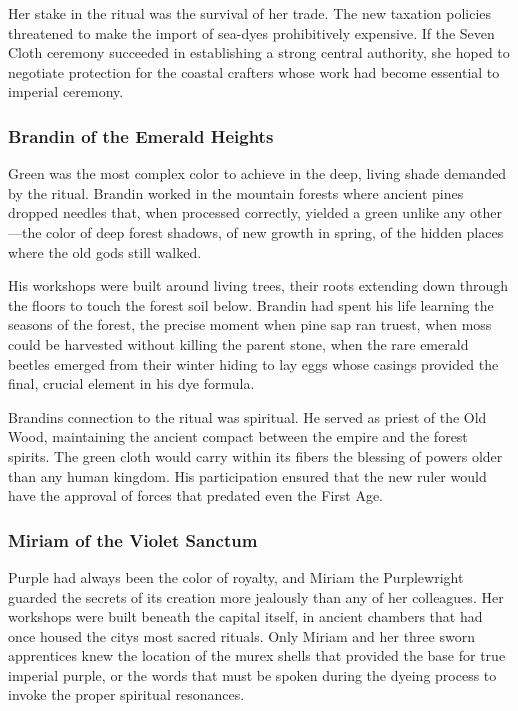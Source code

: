 Her stake in the ritual was the survival of her trade. The new taxation
policies threatened to make the import of sea-dyes prohibitively
expensive. If the Seven Cloth ceremony succeeded in establishing a
strong central authority, she hoped to negotiate protection for the
coastal crafters whose work had become essential to imperial ceremony.

\subsubsection{Brandin of the Emerald
Heights}\label{brandin-of-the-emerald-heights}

Green was the most complex color to achieve in the deep, living shade
demanded by the ritual. Brandin worked in the mountain forests where
ancient pines dropped needles that, when processed correctly, yielded a
green unlike any other---the color of deep forest shadows, of new growth
in spring, of the hidden places where the old gods still walked.

His workshops were built around living trees, their roots extending down
through the floors to touch the forest soil below. Brandin had spent his
life learning the seasons of the forest, the precise moment when pine
sap ran truest, when moss could be harvested without killing the parent
stone, when the rare emerald beetles emerged from their winter hiding to
lay eggs whose casings provided the final, crucial element in his dye
formula.

Brandin\textquotesingle s connection to the ritual was spiritual. He
served as priest of the Old Wood, maintaining the ancient compact
between the empire and the forest spirits. The green cloth would carry
within its fibers the blessing of powers older than any human kingdom.
His participation ensured that the new ruler would have the approval of
forces that predated even the First Age.

\subsubsection{Miriam of the Violet
Sanctum}\label{miriam-of-the-violet-sanctum}

Purple had always been the color of royalty, and Miriam the Purplewright
guarded the secrets of its creation more jealously than any of her
colleagues. Her workshops were built beneath the capital itself, in
ancient chambers that had once housed the city\textquotesingle s most
sacred rituals. Only Miriam and her three sworn apprentices knew the
location of the murex shells that provided the base for true imperial
purple, or the words that must be spoken during the dyeing process to
invoke the proper spiritual resonances.


